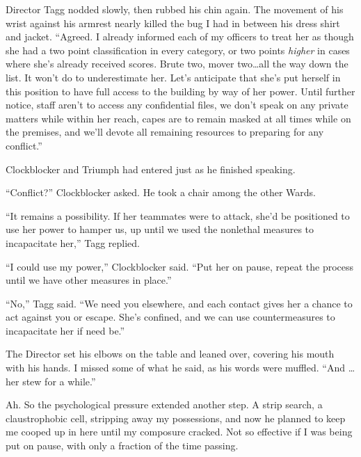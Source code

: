 Director Tagg nodded slowly, then rubbed his chin again.  The movement of his wrist against his armrest nearly killed the bug I had in between his dress shirt and jacket.  ``Agreed.  I already informed each of my officers to treat her as though she had a two point classification in every category, or two points \emph{higher} in cases where she's already received scores.  Brute two, mover two\ldots all the way down the list.  It won't do to underestimate her.  Let's anticipate that she's put herself in this position to have full access to the building by way of her power.  Until further notice, staff aren't to access any confidential files, we don't speak on any private matters while within her reach, capes are to remain masked at all times while on the premises, and we'll devote all remaining resources to preparing for any conflict.''



Clockblocker and Triumph had entered just as he finished speaking.



``Conflict?'' Clockblocker asked.  He took a chair among the other Wards.



``It remains a possibility.  If her teammates were to attack, she'd be positioned to use her power to hamper us, up until we used the nonlethal measures to incapacitate her,'' Tagg replied.



``I could use my power,'' Clockblocker said.  ``Put her on pause, repeat the process until we have other measures in place.''



``No,'' Tagg said.  ``We need you elsewhere, and each contact gives her a chance to act against you or escape.  She's confined, and we can use countermeasures to incapacitate her if need be.''



The Director set his elbows on the table and leaned over, covering his mouth with his hands.  I missed some of what he said, as his words were muffled.  ``And \ldots her stew for a while.''



Ah.  So the psychological pressure extended another step.  A strip search, a claustrophobic cell, stripping away my possessions, and now he planned to keep me cooped up in here until my composure cracked.  Not so effective if I was being put on pause, with only a fraction of the time passing.



